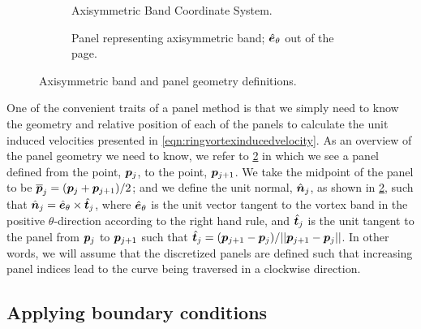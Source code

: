 \begin{figure}[htb]
     \centering
     \begin{subfigure}[t]{0.45\textwidth}
         \centering
        
        \caption{Axisymmetric Band Coordinate System.}
        \label{fig:flatbandgeometry}
     \end{subfigure}
     \hfill
     \begin{subfigure}[t]{0.45\textwidth}
         \centering
         \raisebox{2em}{}
        \caption{Panel representing axisymmetric band; \(\hat{\bm{e}}_\theta\) out of the page.}
        \label{fig:flatpanelgeometry}
     \end{subfigure}
    \caption{Axisymmetric band and panel geometry definitions.}
    \label{fig:axisymmetricbandpanelgeometry}
\end{figure}

One of the convenient traits of a panel method is that we simply need to know the geometry and relative position of each of the panels to calculate the unit induced velocities presented in \cref{eqn:ringvortexinducedvelocity}.
%
As an overview of the panel geometry we need to know, we refer to \cref{fig:flatpanelgeometry} in which we see a panel defined from the point, {\(\bm{p}_j\)}, to the point, {\(\bm{p}_{j+1}\)}.
%
We take the midpoint of the panel to be \({\overline{\bm{p}}_j}={(\bm{p}_{j}+\bm{p}_{j+1})}/2\); and we define the unit normal, {\(\hat{\bm{n}}_j\)}, as shown in \cref{fig:flatpanelgeometry},
such that \(\hat{\bm{n}}_j=\hat{\bm{e}}_\theta\times\hat{\bm{t}}_j\),
where \(\hat{\bm{e}}_\theta\) is the unit vector tangent to the vortex band in the positive \(\theta\)-direction according to the right hand rule,
and {\(\hat{\bm{t}}_j\)} is the unit tangent to the panel from {\(\bm{p}_j\)} to {\(\bm{p}_{j+1}\)}
such that \(\hat{\bm{t}}_j = (\bm{p}_{j+1}-\bm{p}_j)/||\bm{p}_{j+1}-\bm{p}_j||\).
%
In other words, we will assume that the discretized panels are defined such that increasing panel indices lead to the curve being traversed in a clockwise direction.

\subsection{Applying boundary conditions}

